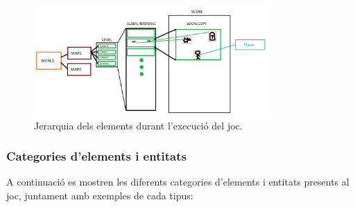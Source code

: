 \documentclass[a4paper,12pt]{article}
\begin{document}
\begin{figure}[ht!]
    \centering
    \includegraphics[width=0.8\textwidth]{../imgs/global_to_local.png} %
    \caption{Jerarquia dels elements durant l'execució del joc.}
    \label{fig:global_to_local}
\end{figure}

\subsubsection{Categories d'elements i entitats}

A continuació es mostren les diferents categories d'elements i entitats presents al joc, juntament amb exemples de cada tipus:
\end{document}
